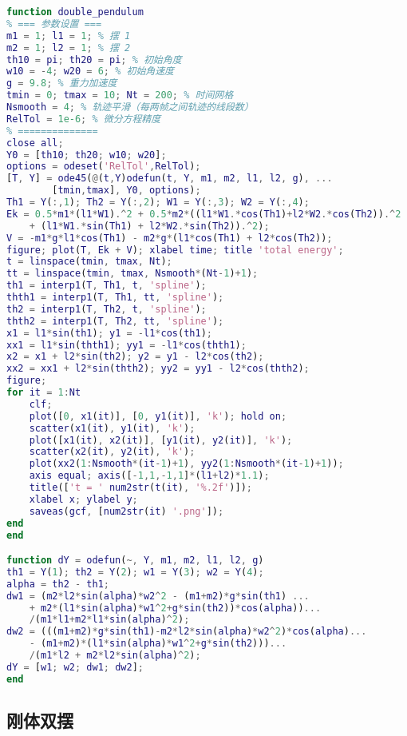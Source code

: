 \begin{lstlisting}[language=matlab, caption=double\_pendulum.m]
% 双摆运动
function double_pendulum
% === 参数设置 ===
m1 = 1; l1 = 1; % 摆 1
m2 = 1; l2 = 1; % 摆 2
th10 = pi; th20 = pi; % 初始角度
w10 = -4; w20 = 6; % 初始角速度
g = 9.8; % 重力加速度
tmin = 0; tmax = 10; Nt = 200; % 时间网格
Nsmooth = 4; % 轨迹平滑（每两帧之间轨迹的线段数）
RelTol = 1e-6; % 微分方程精度
% ==============
close all;
Y0 = [th10; th20; w10; w20];
options = odeset('RelTol',RelTol);
[T, Y] = ode45(@(t,Y)odefun(t, Y, m1, m2, l1, l2, g), ...
        [tmin,tmax], Y0, options);
Th1 = Y(:,1); Th2 = Y(:,2); W1 = Y(:,3); W2 = Y(:,4);
Ek = 0.5*m1*(l1*W1).^2 + 0.5*m2*((l1*W1.*cos(Th1)+l2*W2.*cos(Th2)).^2 ...
    + (l1*W1.*sin(Th1) + l2*W2.*sin(Th2)).^2);
V = -m1*g*l1*cos(Th1) - m2*g*(l1*cos(Th1) + l2*cos(Th2));
figure; plot(T, Ek + V); xlabel time; title 'total energy';
t = linspace(tmin, tmax, Nt);
tt = linspace(tmin, tmax, Nsmooth*(Nt-1)+1);
th1 = interp1(T, Th1, t, 'spline');
thth1 = interp1(T, Th1, tt, 'spline');
th2 = interp1(T, Th2, t, 'spline');
thth2 = interp1(T, Th2, tt, 'spline');
x1 = l1*sin(th1); y1 = -l1*cos(th1);
xx1 = l1*sin(thth1); yy1 = -l1*cos(thth1);
x2 = x1 + l2*sin(th2); y2 = y1 - l2*cos(th2);
xx2 = xx1 + l2*sin(thth2); yy2 = yy1 - l2*cos(thth2);
figure;
for it = 1:Nt
    clf;
    plot([0, x1(it)], [0, y1(it)], 'k'); hold on;
    scatter(x1(it), y1(it), 'k');
    plot([x1(it), x2(it)], [y1(it), y2(it)], 'k');
    scatter(x2(it), y2(it), 'k');
    plot(xx2(1:Nsmooth*(it-1)+1), yy2(1:Nsmooth*(it-1)+1));
    axis equal; axis([-1,1,-1,1]*(l1+l2)*1.1);
    title(['t = ' num2str(t(it), '%.2f')]);
    xlabel x; ylabel y;
    saveas(gcf, [num2str(it) '.png']);
end
end

function dY = odefun(~, Y, m1, m2, l1, l2, g)
th1 = Y(1); th2 = Y(2); w1 = Y(3); w2 = Y(4);
alpha = th2 - th1;
dw1 = (m2*l2*sin(alpha)*w2^2 - (m1+m2)*g*sin(th1) ...
    + m2*(l1*sin(alpha)*w1^2+g*sin(th2))*cos(alpha))...
    /(m1*l1+m2*l1*sin(alpha)^2);
dw2 = (((m1+m2)*g*sin(th1)-m2*l2*sin(alpha)*w2^2)*cos(alpha)...
    - (m1+m2)*(l1*sin(alpha)*w1^2+g*sin(th2)))...
    /(m1*l2 + m2*l2*sin(alpha)^2);
dY = [w1; w2; dw1; dw2];
end
\end{lstlisting}

\subsection{刚体双摆}

